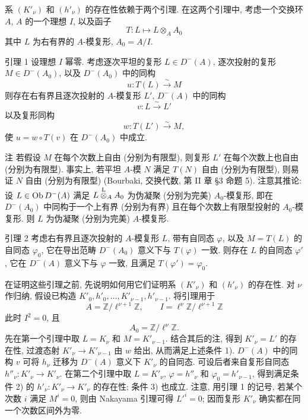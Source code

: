 系 $(K'_\nu)$ 和 $(h'_\nu)$ 的存在性依赖于两个引理. 在这两个引理中, 考虑一个交换环 $A$, $A$ 的一个理想 $I$, 以及函子
\[
T:L\longmapsto L\otimes_A A_0
\]
其中 $L$ 为右有界的 $A$-模复形, $A_0=A/I$.

\begin{statement}{引理 1}
设理想 $I$ 幂零. 考虑逐次平坦的复形 $L\in D^-(A)$, 逐次投射的复形 $M\in D^-(A_0)$, 以及 $D^-(A_0)$ 中的同构
\[
u:T(L)\xrightarrow{\sim}M
\]
则存在右有界且逐次投射的 $A$-模复形 $L'$, $D^-(A)$ 中的同构
\[
v:L\xrightarrow{\sim}L'
\]
以及复形同构
\[
w:T(L')\xrightarrow{\sim}M,
\]
使 $u=w\circ T(v)$ 在 $D^-(A_0)$ 中成立.
\end{statement}

\begin{statement}{注}
若假设 $M$ 在每个次数上自由 (分别为有限型), 则复形 $L'$ 在每个次数上也自由 (分别为有限型). 事实上, 若平坦 $A$-模 $N$ 满足 $T(N)$ 自由 (分别为有限型), 则易证 $N$ 自由 (分别为有限型) (Bourbaki, 交换代数, 第 II 章 §3 命题 5). 注意其推论: 设 $L\in\operatorname{Ob} D^-(A)$ 满足 $L\overset{\mathrm L}{\otimes}_A A_0$ 为伪凝聚 (分别为完美) $A_0$-模复形, 即在 $D^-(A_0)$ 中同构于一个上有界 (分别为有界) 且在每个次数上有限型投射的 $A_0$-模复形. 则 $L$ 为伪凝聚 (分别为完美) $A$-模复形.
\end{statement}

\begin{statement}{引理 2}
考虑右有界且逐次投射的 $A$-模复形 $L$, 带有自同态 $\varphi$, 以及 $M=T(L)$ 的自同态 $\varphi_0$, 它在导出范畴 $D^-(A_0)$ 意义下与 $T(\varphi)$ 一致. 则存在 $L$ 的自同态 $\varphi'$, 它在 $D^-(A)$ 意义下与 $\varphi$ 一致, 且满足 $T(\varphi')=\varphi_0$.
\end{statement}

在证明这些引理之前, 先说明如何用它们证明系 $(K'_\nu)$ 和 $(h'_\nu)$ 的存在性. 对 $\nu$ 作归纳, 假设已构造 $K'_0,h'_0,\ldots,K'_{\nu-1},h'_{\nu-1}$. 将引理用于
\[
A=\mathbb Z/\ell^{\nu+1}\mathbb Z,
\qquad
I=\ell^\nu\mathbb Z/\ell^{\nu+1}\mathbb Z
\]
此时 $I^2=0$, 且
\[
A_0=\mathbb Z/\ell^\nu\mathbb Z.
\]
先在第一个引理中取 $L=K_\nu$ 和 $M=K'_{\nu-1}$. 结合其后的注, 得到 $K'_\nu=L'$ 的存在性, 过渡态射 $K'_\nu\to K'_{\nu-1}$ 由 $w$ 给出, 从而满足上述条件 1). $D^-(A)$ 中的同构 $v$ 可将 $h_\nu$ 迁移为 $D^-(A)$ 意义下 $K'_\nu$ 的自同态. 可设后者来自复形自同态 $h''_\nu:K'_\nu\to K'_\nu$. 在第二个引理中取 $L=K'_\nu$, $\varphi=h''_\nu$ 和 $\varphi_0=h'_{\nu-1}$, 得到满足条件 2) 的 $h'_\nu:K'_\nu\to K'_\nu$ 的存在性; 条件 3) 也成立. 注意, 用引理 1 的记号, 若某个次数 $i$ 满足 $M^i=0$, 则由 Nakayama 引理可得 $L'^i=0$; 因而复形 $K'_\nu$ 确实都在同一个次数区间外为零.

